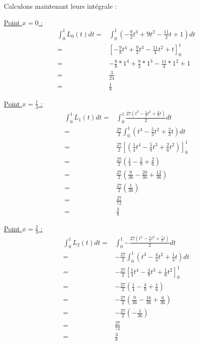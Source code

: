 \documentclass[12pt, letterpaper]{article}
\begin{document}
\begin{enumerate}
Calculons maintenant leurs intégrale :

\underline{Point $x = 0$ :}
\begin{equation*}
  \begin{split}
    \int_0^1 {L_0(t)dt} = & \int_0^1 {\left( - \frac{9}{2}t^3 + 9 t^2
      - \frac{11}{2}t + 1 \right) dt}\\
    = &  \left[ - \frac{9}{8}t^4 + \frac{9}{3} t^3
      - \frac{11}{4} t^2 + t  \right]_0^1 \\
    = & - \frac{9}{8} * 1^4 + \frac{9}{3} * 1^3 -
    \frac{11}{4} * 1^2 + 1 \\
    = & \frac{3}{24} \\
    = & \frac{1}{8}
  \end{split}
\end{equation*}

\underline{Point $x = \frac{1}{3}$ :}
\begin{equation*}
  \begin{split}
    \int_0^1 {L_1(t) dt} = & \int_0^1 {\frac{27 (t^3 - \frac{5}{3}t^2 + \frac{2}{3}t)}
      {2} dt} \\
    = & \frac{27}{2} \int_0^1 { \left( t^3 - \frac{5}{3}t^2 + \frac{2}{3}t \right) 
      dt} \\
    = & \frac{27}{2} \left[ \left( \frac{1}{4}t^4 - \frac{5}{9}t^3 +
      \frac{2}{6}t^2 \right) \right]_0^1 \\
    = & \frac{27}{2} \left( \frac{1}{4} - \frac{5}{9} + \frac{2}{6} \right)  \\
    = & \frac{27}{2} \left( \frac{9}{36} - \frac{20}{36} + \frac{12}{36} \right)  \\
    = & \frac{27}{2} \left(  \frac{1}{36} \right)  \\
    = & \frac{27}{72} \\
    = & \frac{3}{8}
  \end{split}
\end{equation*}

\underline{Point $x = \frac{2}{3}$ :}
\begin{equation*}
  \begin{split}
    \int_0^1 {L_2(t) dt} = & \int_0^1 {- \frac{27 (t^3 - \frac{4}{3}t^2 + \frac{1}{3}t)}
    {2} dt }
    \\
    = & - \frac{27}{2} \int_0^1 { \left( t^3 - \frac{4}{3}t^2 +
      \frac{1}{3}t \right) dt }
    \\
    = & - \frac{27}{2} \left[ \frac{1}{4}t^4 - \frac{4}{9}t^3 +
      \frac{1}{6}t^2 \right]_0^1
    \\
    = & - \frac{27}{2} \left( \frac{1}{4} - \frac{4}{9} + \frac{1}{6} \right) 
    \\
    = & - \frac{27}{2} \left( \frac{9}{36} - \frac{16}{36} +
    \frac{6}{36} \right)
    \\
    = & - \frac{27}{2} \left( - \frac{1}{36} \right) 
    \\
    = & \frac{27}{72}
    \\
    = & \frac{3}{8}
    \\
  \end{split}
\end{equation*}


\end{enumerate}
\end{document}
